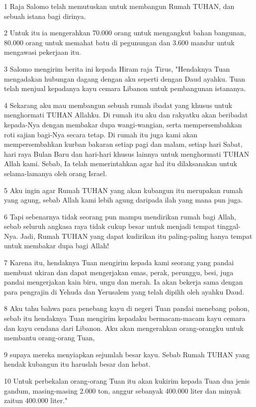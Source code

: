 \par 1 Raja Salomo telah memutuskan untuk membangun Rumah TUHAN, dan sebuah istana bagi dirinya.
\par 2 Untuk itu ia mengerahkan 70.000 orang untuk mengangkut bahan bangunan, 80.000 orang untuk memahat batu di pegunungan dan 3.600 mandur untuk mengawasi pekerjaan itu.
\par 3 Salomo mengirim berita ini kepada Hiram raja Tirus, "Hendaknya Tuan mengadakan hubungan dagang dengan aku seperti dengan Daud ayahku. Tuan telah menjual kepadanya kayu cemara Libanon untuk pembangunan istananya.
\par 4 Sekarang aku mau membangun sebuah rumah ibadat yang khusus untuk menghormati TUHAN Allahku. Di rumah itu aku dan rakyatku akan beribadat kepada-Nya dengan membakar dupa wangi-wangian, serta mempersembahkan roti sajian bagi-Nya secara tetap. Di rumah itu juga kami akan mempersembahkan kurban bakaran setiap pagi dan malam, setiap hari Sabat, hari raya Bulan Baru dan hari-hari khusus lainnya untuk menghormati TUHAN Allah kami. Sebab, Ia telah memerintahkan agar hal itu dilaksanakan untuk selama-lamanya oleh orang Israel.
\par 5 Aku ingin agar Rumah TUHAN yang akan kubangun itu merupakan rumah yang agung, sebab Allah kami lebih agung daripada ilah yang mana pun juga.
\par 6 Tapi sebenarnya tidak seorang pun mampu mendirikan rumah bagi Allah, sebab seluruh angkasa raya tidak cukup besar untuk menjadi tempat tinggal-Nya. Jadi, Rumah TUHAN yang dapat kudirikan itu paling-paling hanya tempat untuk membakar dupa bagi Allah!
\par 7 Karena itu, hendaknya Tuan mengirim kepada kami seorang yang pandai membuat ukiran dan dapat mengerjakan emas, perak, perunggu, besi, juga pandai mengerjakan kain biru, ungu dan merah. Ia akan bekerja sama dengan para pengrajin di Yehuda dan Yerusalem yang telah dipilih oleh ayahku Daud.
\par 8 Aku tahu bahwa para penebang kayu di negeri Tuan pandai menebang pohon, sebab itu hendaknya Tuan mengirim kepadaku bermacam-macam kayu cemara dan kayu cendana dari Libanon. Aku akan mengerahkan orang-orangku untuk membantu orang-orang Tuan,
\par 9 supaya mereka menyiapkan sejumlah besar kayu. Sebab Rumah TUHAN yang hendak kubangun itu haruslah besar dan hebat.
\par 10 Untuk perbekalan orang-orang Tuan itu akan kukirim kepada Tuan dua jenis gandum, masing-masing 2.000 ton, anggur sebanyak 400.000 liter dan minyak zaitun 400.000 liter."
